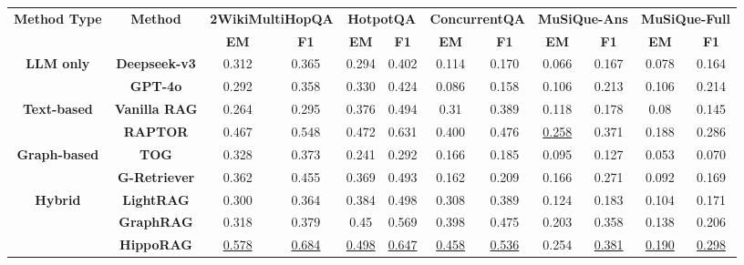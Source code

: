 \documentclass[letterpaper]{article} %
\begin{document}
\begin{table}[!htbp]
\centering
\small
\begin{tabular}{cccccccccccc}
\toprule
\multirow{2}{*}{\textbf{Method Type}} & \multirow{2}{*}{\textbf{Method}} 
& \multicolumn{2}{c}{\textbf{2WikiMultiHopQA}} 
& \multicolumn{2}{c}{\textbf{HotpotQA}}
& \multicolumn{2}{c}{\textbf{ConcurrentQA}}  
& \multicolumn{2}{c}{\textbf{MuSiQue-Ans}} 
& \multicolumn{2}{c}{\textbf{MuSiQue-Full}} \\
\cmidrule(lr){3-4} \cmidrule(lr){5-6} \cmidrule(lr){7-8} \cmidrule(lr){9-10} \cmidrule(lr){11-12}
& & \textbf{EM} & \textbf{F1} & \textbf{EM} & \textbf{F1} & \textbf{EM} & \textbf{F1} & \textbf{EM} & \textbf{F1} & \textbf{EM} & \textbf{F1} \\
\midrule
\multirow{2}{*}{\textbf{LLM only}} 

& \textbf{Deepseek-v3} 
& 0.312 & 0.365
& 0.294 & 0.402 
& 0.114 & 0.170
& 0.066 & 0.167
& 0.078 & 0.164 
 \\

\cmidrule(lr){2-12}
& \textbf{GPT-4o} 
& 0.292 & 0.358
& 0.330 & 0.424 
& 0.086 & 0.158
& 0.106 & 0.213
& 0.106 & 0.214 
 \\

\midrule
\multirow{2}{*}{\textbf{Text-based}} 
& \textbf{Vanilla RAG} 
& 0.264 & 0.295 
& 0.376 & 0.494 
& 0.31 &0.389 
& 0.118 & 0.178
& 0.08 & 0.145 
  \\

\cmidrule(lr){2-12}
& \textbf{RAPTOR}
& 0.467 & 0.548 
& 0.472 & 0.631
& 0.400 & 0.476
& \underline{0.258} & 0.371
& 0.188 & 0.286 
\\
\midrule
\multirow{2}{*}{\textbf{Graph-based}} 
& \textbf{TOG} 
& 0.328 & 0.373 
& 0.241 & 0.292 
& 0.166 & 0.185 
& 0.095 & 0.127
& 0.053 & 0.070 
\\

\cmidrule(lr){2-12}
& \textbf{G-Retriever} 
& 0.362 & 0.455 
& 0.369 & 0.493
& 0.162 & 0.209 
& 0.166 & 0.271
& 0.092 & 0.169 
 \\


\midrule
\multirow{4}{*}{\textbf{Hybrid}} 

& \textbf{LightRAG} 
& 0.300 & 0.364 
& 0.384 & 0.498
& 0.308 & 0.389
& 0.124 & 0.183
& 0.104 & 0.171 
\\
\cmidrule(lr){2-12}
& \textbf{GraphRAG} 
& 0.318 & 0.379 
& 0.45 & 0.569
& 0.398 & 0.475
& 0.203 & 0.358
& 0.138 & 0.206 
\\

\cmidrule(lr){2-12}
 & \textbf{HippoRAG} 
 & \underline{0.578} & \underline{0.684} 
 & \underline{0.498} & \underline{0.647}
 & \underline{0.458} & \underline{0.536}
  & 0.254 & \underline{0.381}
 & \underline{0.190} & \underline{0.298}
 \\
 

\end{tabular}
\end{table}
\end{document}

